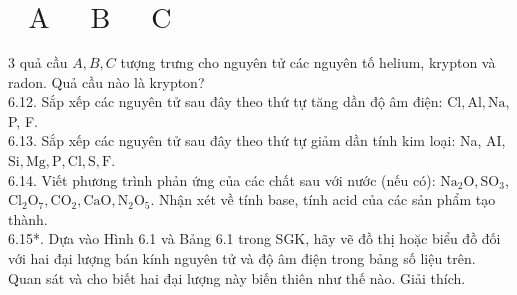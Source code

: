 \documentclass[10pt]{article}
\begin{document}
\section*{$\begin{array}{lll}\text { A } & \text { B } & \text { C }\end{array}$}
3 quả cầu $A, B, C$ tượng trưng cho nguyên tử các nguyên tố helium, krypton và radon. Quả cầu nào là krypton?\\
6.12. Sắp xếp các nguyên tử sau đây theo thứ tự tăng dần độ âm điện: $\mathrm{Cl}, \mathrm{Al}, \mathrm{Na}$, P, F.\\
6.13. Sắp xếp các nguyên tử sau đây theo thứ tự giảm dần tính kim loại: Na, AI, $\mathrm{Si}, \mathrm{Mg}, \mathrm{P}, \mathrm{Cl}, \mathrm{S}, \mathrm{F}$.\\
6.14. Viết phương trình phản ứng của các chất sau với nước (nếu có): $\mathrm{Na}_{2} \mathrm{O}, \mathrm{SO}_{3}$, $\mathrm{Cl}_{2} \mathrm{O}_{7}, \mathrm{CO}_{2}, \mathrm{CaO}, \mathrm{N}_{2} \mathrm{O}_{5}$. Nhận xét về tính base, tính acid của các sản phẩm tạo thành.\\
6.15*. Dựa vào Hình 6.1 và Bảng 6.1 trong SGK, hãy vẽ đồ thị hoặc biểu đồ đối với hai đại lượng bán kính nguyên tử và độ âm điện trong bảng số liệu trên. Quan sát và cho biết hai đại lượng này biến thiên như thế nào. Giải thích.
\end{document}
